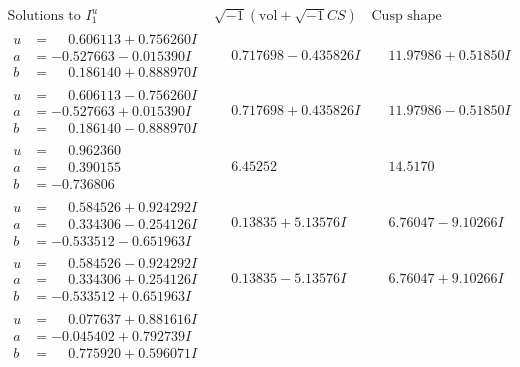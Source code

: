 \documentclass[1p]{elsarticle_modified}
\theoremstyle{definition}
\newcommand{\I}{\sqrt{-1}}
\begin{document}
$$\begin{array}{c|c|c}  
\text{Solutions to }I^u_{1}& \I (\text{vol} + \sqrt{-1}CS) & \text{Cusp shape}\\
 \hline 
\begin{aligned}
u &= \phantom{-}0.606113 + 0.756260 I \\
a &= -0.527663 - 0.015390 I \\
b &= \phantom{-}0.186140 + 0.888970 I\end{aligned}
 & \phantom{-}0.717698 - 0.435826 I & \phantom{-}11.97986 + 0.51850 I \\ \hline\begin{aligned}
u &= \phantom{-}0.606113 - 0.756260 I \\
a &= -0.527663 + 0.015390 I \\
b &= \phantom{-}0.186140 - 0.888970 I\end{aligned}
 & \phantom{-}0.717698 + 0.435826 I & \phantom{-}11.97986 - 0.51850 I \\ \hline\begin{aligned}
u &= \phantom{-}0.962360\phantom{ +0.000000I} \\
a &= \phantom{-}0.390155\phantom{ +0.000000I} \\
b &= -0.736806\phantom{ +0.000000I}\end{aligned}
 & \phantom{-}6.45252\phantom{ +0.000000I} & \phantom{-}14.5170\phantom{ +0.000000I} \\ \hline\begin{aligned}
u &= \phantom{-}0.584526 + 0.924292 I \\
a &= \phantom{-}0.334306 - 0.254126 I \\
b &= -0.533512 - 0.651963 I\end{aligned}
 & \phantom{-}0.13835 + 5.13576 I & \phantom{-}6.76047 - 9.10266 I \\ \hline\begin{aligned}
u &= \phantom{-}0.584526 - 0.924292 I \\
a &= \phantom{-}0.334306 + 0.254126 I \\
b &= -0.533512 + 0.651963 I\end{aligned}
 & \phantom{-}0.13835 - 5.13576 I & \phantom{-}6.76047 + 9.10266 I \\ \hline\begin{aligned}
u &= \phantom{-}0.077637 + 0.881616 I \\
a &= -0.045402 + 0.792739 I \\
b &= \phantom{-}0.775920 + 0.596071 I\end{aligned}

\end{array}$$
\end{document}
